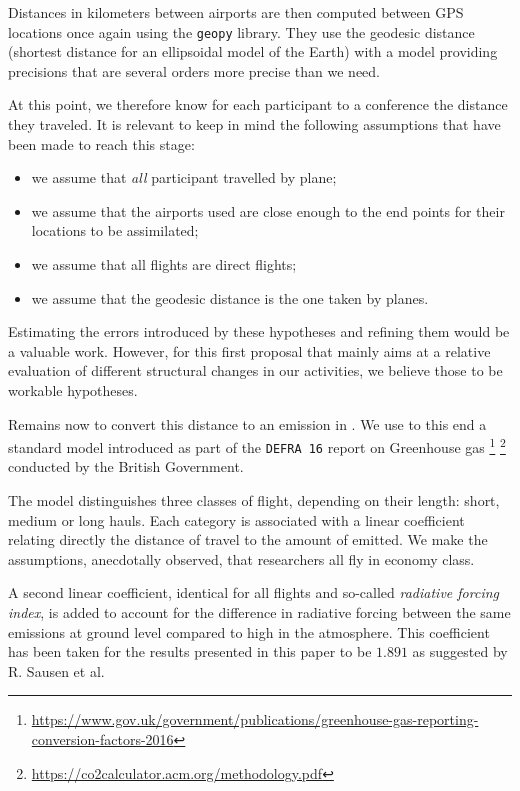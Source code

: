 Distances in kilometers between airports are then computed between GPS locations
once again using the \texttt{geopy} library. They use the geodesic distance
(shortest distance for an ellipsoidal model of the Earth) with a model providing
precisions that are several orders more precise than we need.

At this point, we therefore know for each participant to a conference the
distance they traveled.
It is relevant to keep in mind the following assumptions that have
been made to reach this stage:
\begin{itemize}
\item we assume that \emph{all} participant travelled by plane;
\item we assume that the airports used are close enough to the end points for their locations to be assimilated;
\item we assume that all flights are direct flights;
\item we assume that the geodesic distance is the one taken by planes.
\end{itemize}

Estimating the errors introduced by these hypotheses and refining them would be
a valuable work. However, for this first proposal that mainly aims at a relative
evaluation of different structural changes in our activities, we believe those
to be workable hypotheses.

Remains now to convert this distance to an emission in \gaz. We use to this end
a standard model introduced as part of the \texttt{DEFRA 16} report on
Greenhouse gas
\footnote{\url{https://www.gov.uk/government/publications/greenhouse-gas-reporting-conversion-factors-2016}}
\footnote{\url{https://co2calculator.acm.org/methodology.pdf}}
conducted by the British Government.

The model distinguishes three classes of flight, depending on their length:
short, medium or long hauls. Each category is associated with a linear
coefficient relating directly the distance of travel to the amount of \gaz
emitted. We make the assumptions, anecdotally observed, that researchers all
fly in economy class.

A second linear coefficient, identical for all flights and so-called
\emph{radiative forcing index}, is added to account for the difference in
radiative forcing between the same emissions at ground level compared to high in
the atmosphere. This coefficient has been taken for the results presented in this
paper to be $1.891$ as suggested by R. Sausen et al.~\cite{Sausen05}


